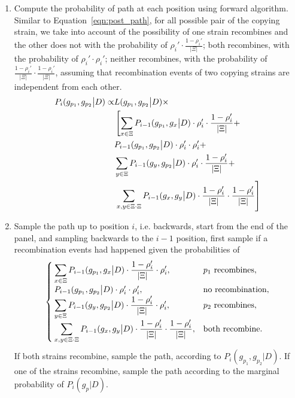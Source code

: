 \documentclass{bioinfo}
\begin{document}
\begin{enumerate}
\item
Compute the probability of path at each position using forward algorithm. Similar to Equation~\eqref{eqn:post_path}, for all possible pair of the copying strain, we take into account of the possibility of one strain recombines and the other does not with the probability of $\rho_i' \cdot \frac{1-\rho_i'}{|\Xi|}$; both recombines, with the probability of $\rho_i' \cdot \rho_i'$; neither recombines, with the probability of $\frac{1-\rho_i'}{|\Xi|} \cdot\frac{1-\rho_i'}{|\Xi|}$, assuming that recombination events of two copying strains are independent from each other.
\begin{equation}
\begin{split}
P_{i}(g_{p_1},g_{p_2}\big{|}D) \propto & L(g_{p_1},g_{p_2} \big{|} D) \times \\
                                       & \left[\sum_{x\in \Xi} P_{i-1}(g_{p_1},g_{x}\big{|}D) \cdot \rho_i' \cdot \frac{1-\rho_i'}{|\Xi|} + \right.\\
                                       &  P_{i-1}(g_{p_1},g_{p_2}\big{|}D) \cdot \rho_i' \cdot \rho_i' + \\
                                       & \sum_{y\in \Xi} P_{i-1}(g_{y},g_{p_2}\big{|}D) \cdot \rho_i' \cdot\frac{1-\rho_i'}{|\Xi|}+ \\
                                       & \left.\sum_{x,y\in \Xi\cdot \Xi} P_{i-1}(g_{x},g_{y}\big{|}D)  \cdot\frac{1-\rho_i'}{|\Xi|} \cdot\frac{1-\rho_i'}{|\Xi|} \right] \label{eqn:prob.update.two}
\end{split}
\end{equation}

\item
Sample the path up to position $i$, i.e. backwards, start from the end of the panel, and sampling backwards to the $i-1$ position, first sample if a recombination events had happened given the probabilities of
$$\begin{cases}
\displaystyle\sum_{x\in \Xi}P_{i-1}(g_{p_1},g_{x}\big{|}D) \cdot \frac{1-\rho_i'}{|\Xi|}\cdot \rho_i', & p_1 \text{ recombines} \label{eqn:prob.update.two.v}, \\
P_{i-1}(g_{p_1},g_{p_2}\big{|}D) \cdot \rho_i' \cdot \rho_i', & \text{no recombination},\\
\displaystyle\sum_{y\in \Xi}P_{i-1}(g_{y},g_{p_2}\big{|}D) \cdot \frac{1-\rho_i'}{|\Xi|} \cdot \rho_i', & p_2 \text{ recombines} \label{eqn:prob.update.two.u}, \\
\displaystyle\sum_{x,y\in \Xi \cdot \Xi} P_{i-1}(g_{x},g_{y}\big{|}D) \cdot\frac{1-\rho_i'}{|\Xi|} \cdot \frac{1-\rho_i'}{|\Xi|} , & \text{both recombine}.
\end{cases}$$
If both strains recombine, sample the path, according to $P_i(g_{p_1}, g_{p_2}|D)$. If one of the strains recombine, sample the path according to the marginal probability of $P_i(g_{p}|D)$.


\end{enumerate}
\end{document}
